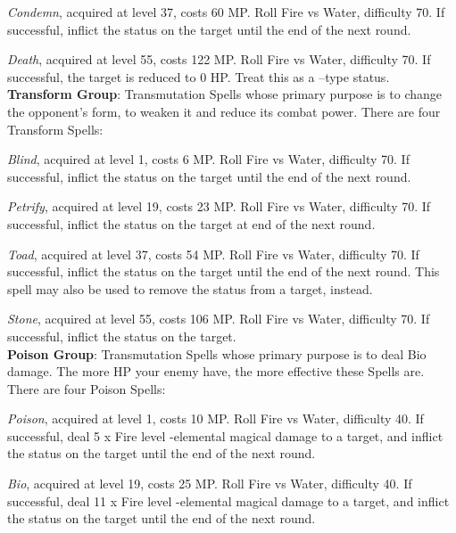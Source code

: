 \begin{multicols}{2}
    \textit{Condemn}, acquired at level 37, costs 60 MP\@. Roll Fire vs Water, difficulty 70. If successful, inflict the  status on the target until the end of the next round.
    
    \textit{Death}, acquired at level 55, costs 122 MP\@. Roll Fire vs Water, difficulty 70. If successful, the target is reduced to 0 HP\@. Treat this as a –type status.\\%
    
    \textbf{Transform Group}: Transmutation Spells whose primary purpose is to change the opponent’s form, to weaken it and reduce its combat power. There are four Transform Spells:
    
    \textit{Blind}, acquired at level 1, costs 6 MP\@. Roll Fire vs Water, difficulty 70. If successful, inflict the  status on the target until the end of the next round.
    
    \textit{Petrify}, acquired at level 19, costs 23 MP\@. Roll Fire vs Water, difficulty 70. If successful, inflict the  status on the target at end of the next round.
    
    \textit{Toad}, acquired at level 37, costs 54 MP\@. Roll Fire vs Water, difficulty 70. If successful, inflict the  status on the target until the end of the next round. This spell may also be used to remove the  status from a target, instead.
    
    \textit{Stone}, acquired at level 55, costs 106 MP\@. Roll Fire vs Water, difficulty 70. If successful, inflict the  status on the target.\\%
    
    \textbf{Poison Group}: Transmutation Spells whose primary purpose is to deal Bio damage. The more HP your enemy have, the more effective these Spells are. There are four Poison Spells:
    
    \textit{Poison}, acquired at level 1, costs 10 MP\@. Roll Fire vs Water, difficulty 40. If successful, deal 5 x Fire level -elemental magical damage to a target, and inflict the  status on the target until the end of the next round.
    
    \textit{Bio}, acquired at level 19, costs 25 MP\@. Roll Fire vs Water, difficulty 40. If successful, deal 11 x Fire level -elemental magical damage to a target, and inflict the  status on the target until the end of the next round.
    

\end{multicols}
